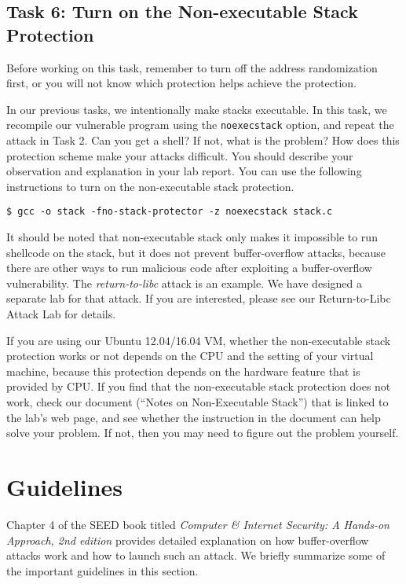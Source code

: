 \subsection{Task 6: Turn on the Non-executable Stack Protection}

Before working on this task, remember to turn off the address
randomization first, or you will not know which protection helps 
achieve the protection.

In our previous tasks, we intentionally make stacks executable.
In this task, we recompile our vulnerable program 
using the {\tt noexecstack} option, and repeat the attack in
Task 2. Can you get a shell? If not, what is the problem? How does
this protection scheme make your attacks difficult. 
You should describe your observation and explanation
in your lab report. You can use the following instructions to turn
on the non-executable stack protection.

\begin{lstlisting}
$ gcc -o stack -fno-stack-protector -z noexecstack stack.c
\end{lstlisting}


It should be noted that non-executable stack only makes it impossible to run shellcode 
on the stack, but it does not prevent buffer-overflow attacks, 
because there are other ways to run malicious code after exploiting 
a buffer-overflow vulnerability. The {\em return-to-libc} attack
is an example. We have designed a separate lab for that 
attack. If you are interested, please see our 
Return-to-Libc Attack Lab for details.


If you are using our Ubuntu 12.04/16.04 VM, whether the non-executable stack
protection works or not depends on the CPU and the setting of your virtual
machine, because this
protection depends on the hardware feature that is provided by CPU. If you 
find that the non-executable stack protection does not work, check our
document (``Notes on Non-Executable Stack'') that is linked to the lab's web page, and see whether the
instruction in the document can help solve your problem. If not, then you
may need to figure out the problem yourself.




\section{Guidelines}


Chapter 4 of the SEED book titled \textit{Computer \& Internet 
Security: A Hands-on Approach, 2nd edition}
provides detailed explanation on how buffer-overflow attacks work and how to 
launch such an attack. We briefly summarize some of the important guidelines
in this section.


